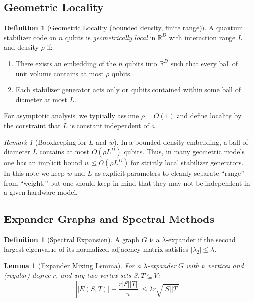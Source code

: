 \documentclass[11pt,a4paper]{article}
\newtheorem{lemma}[theorem]{Lemma}
\theoremstyle{definition}
\newtheorem{definition}[theorem]{Definition}
\theoremstyle{remark}
\newtheorem{remark}[theorem]{Remark}
\begin{document}
\subsection{Geometric Locality}

\begin{definition}[Geometric Locality (bounded density, finite range)]
A quantum stabilizer code on $n$ qubits is \emph{geometrically local} in $\mathbb{R}^D$ with interaction range $L$ and density $\rho$ if:
\begin{enumerate}
    \item There exists an embedding of the $n$ qubits into $\mathbb{R}^D$ such that every ball of unit volume contains at most $\rho$ qubits.
    \item Each stabilizer generator acts only on qubits contained within some ball of diameter at most $L$.
\end{enumerate}
For asymptotic analysis, we typically assume $\rho = O(1)$ and define locality by the constraint that $L$ is constant independent of $n$.
\end{definition}

\begin{remark}[Bookkeeping for $L$ and $w$]
In a bounded-density embedding, a ball of diameter $L$ contains at most $O(\rho L^D)$ qubits. Thus, in many geometric models one has an implicit bound $w \le O(\rho L^D)$ for strictly local stabilizer generators. In this note we keep $w$ and $L$ as explicit parameters to cleanly separate ``range'' from ``weight,'' but one should keep in mind that they may not be independent in a given hardware model.
\end{remark}

\subsection{Expander Graphs and Spectral Methods}

\begin{definition}[Spectral Expansion]
A graph $G$ is a $\lambda$-expander if the second largest eigenvalue of its normalized adjacency matrix satisfies $|\lambda_2| \leq \lambda$.
\end{definition}

\begin{lemma}[Expander Mixing Lemma]
For a $\lambda$-expander $G$ with $n$ vertices and (regular) degree $r$, and any two vertex sets $S, T \subseteq V$:
\[
\left| |E(S,T)| - \frac{r|S||T|}{n} \right| \leq \lambda r \sqrt{|S||T|}
\]
\end{lemma}
\end{document}
